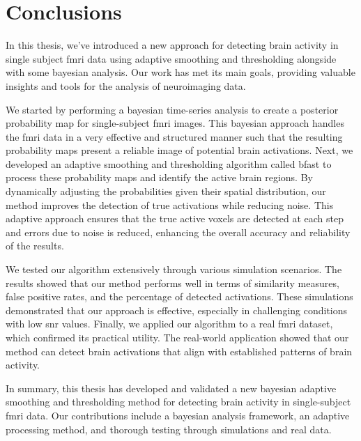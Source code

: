 \chapter{Conclusions}

In this thesis, we've introduced a new approach for detecting brain activity 
in single subject \gls{fmri} data using adaptive smoothing and 
thresholding alongside with some bayesian analysis. Our work has met its 
main goals, providing valuable 
insights and tools for the analysis of neuroimaging data.

We started by performing a bayesian time-series analysis to create a 
posterior probability map for single-subject \gls{fmri} images. This bayesian 
approach handles the \gls{fmri} data in a very effective and structured manner 
such that the resulting probability maps present a reliable image 
of potential brain activations. Next, we developed an adaptive smoothing and 
thresholding algorithm called \gls{bfast} to process these probability maps and 
identify the active brain regions. By dynamically adjusting the probabilities 
given their spatial distribution, our method improves the detection of true 
activations while reducing noise. This adaptive approach ensures that the true 
active voxels are detected at each step and errors due to noise is reduced, enhancing 
the overall accuracy and reliability of the results.

We tested our algorithm extensively through various simulation scenarios. 
The results showed that our method performs well in terms of similarity 
measures, false positive rates, and the percentage of detected activations. 
These simulations demonstrated that our approach is effective, 
especially in challenging conditions with low \gls{snr} values. Finally, we applied our algorithm to a real \gls{fmri} dataset, which confirmed 
its practical utility. The real-world application showed that our method 
can detect brain activations that align with established patterns 
of brain activity. 

In summary, this thesis has developed and validated a new bayesian adaptive 
smoothing and thresholding method for detecting brain activity in single-subject 
\gls{fmri} data. Our contributions include a bayesian analysis framework, 
an adaptive processing method, and thorough testing through simulations and 
real data. 